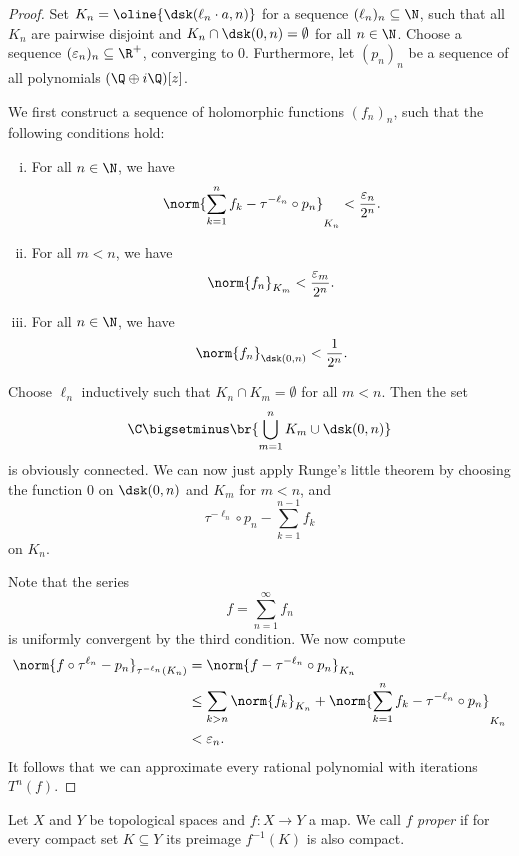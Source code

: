\begin{proof}
Set $K_n = \oline{\dsk(\ell_n \cdot a, n)}$ for a sequence
$(\ell_n)_n \subseteq \N$, such that all $K_n$ are pairwise
disjoint and $K_n \cap \dsk(0, n) = \emptyset$ for all $n \in \N$.
Choose a sequence $(\varepsilon_n)_n \subseteq \R^+$, converging to
$0$. Furthermore, let $(p_n)_n$ be a sequence of all polynomials
$(\Q \oplus i\Q)[z]$.

We first construct a sequence of holomorphic functions $(f_n)_n$,
such that the following conditions hold:

\begin{enumerate}[i)]
\item For all $n \in \N$, we have
\[
\norm{\sum_{k=1}^n f_k - \tau^{-\ell_n} \circ p_n}_{K_n} <
\frac{\varepsilon_n}{2^n}.
\]
\item For all $m < n$, we have
\[
\norm{f_n}_{K_m} < \frac{\varepsilon_m}{2^n}.
\]
\item For all $n \in \N$, we have
\[
\norm{f_n}_{\dsk(0,n)} < \frac{1}{2^n}.
\]
\end{enumerate}

Choose $\ell_n$ inductively such that $K_n \cap K_m = \emptyset$
for all $m < n$. Then the set
\[
\C \bigsetminus \br{\bigcup_{m=1}^n K_m \cup \dsk(0,n)}
\]
is obviously connected. We can now just apply Runge's little
theorem by choosing the function $0$ on $\dsk(0,n)$ and $K_m$ for
$m < n$, and
\[
\tau^{-\ell_n} \circ p_n - \sum_{k=1}^{n-1} f_k
\]
on $K_n$.

Note that the series
\[
f = \sum_{n=1}^\infty f_n
\]
is uniformly convergent by the third condition. We now compute
\begin{align*}
\norm{f \circ \tau^{\ell_n} - p_n}_{\tau^{-\ell_n}(K_n)} &=
\norm{f - \tau^{-\ell_n} \circ p_n}_{K_n}
\\
&\leq
\sum_{k > n} \norm{f_k}_{K_n} +
\norm{\sum_{k=1}^n f_k - \tau^{-\ell_n} \circ p_n}_{K_n}
\\
&<
\varepsilon_n.
\end{align*}
It follows that we can approximate every rational polynomial with
iterations $T^n(f)$.
\end{proof}


\begin{definicija}
Let $X$ and $Y$ be topological spaces and $f \colon X \to Y$ a map.
We call $f$ \emph{proper} if for every compact
set $K \subseteq Y$ its preimage $f^{-1}(K)$ is also compact.
\end{definicija}

